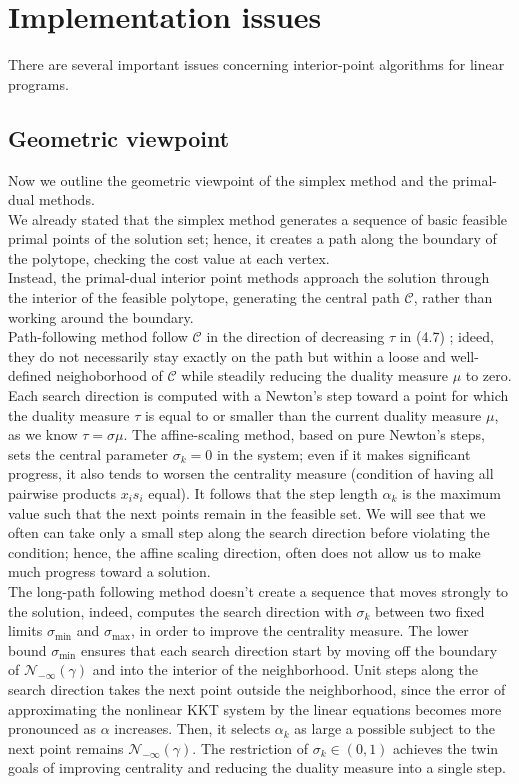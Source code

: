 \documentclass[a4paper,10 pt,titlepage,twoside]{book}
\theoremstyle{plain}
\theoremstyle{definition}
\theoremstyle{remark}
\begin{document}
\chapter{Implementation issues}
There are several important issues concerning interior-point algorithms
for linear programs.\\
\section*{Geometric viewpoint}
Now we outline the geometric viewpoint of the simplex method and the primal-dual methods.\\
We already stated that the simplex method generates a sequence of basic feasible primal points of the solution set; hence, it creates a path along the boundary of the polytope, checking the cost value at each vertex.\\Instead, the primal-dual interior point methods approach the solution through the interior of the feasible polytope, generating the central path $\mathcal{C}$, rather than working around the boundary.\\ Path-following method follow $\mathcal{C}$ in the direction of decreasing $\tau$ in (4.7) ; ideed, they do not necessarily stay exactly on the path but within a loose and well-defined neighoborhood of $\mathcal{C}$ while steadily reducing the duality measure $\mu$ to zero. Each search direction is computed with a Newton's step toward a point for which the duality measure $\tau$ is equal to or smaller than the current duality measure $\mu$, as we know $\tau=\sigma\mu$. 
The affine-scaling method, based on pure Newton's steps, sets the central parameter $\sigma_{k}= 0$ in the system;
even if it makes significant progress, it also tends to worsen the centrality measure (condition of having all pairwise products $x_{i}s_{i}$ equal). It follows that the step length $\alpha_{k}$ is the maximum value such that the next points remain in the feasible set. We will see that we often can take only a small
step along the search direction before violating the condition; hence, the affine scaling direction, often does not allow us to make much progress toward a solution.\\ 
The long-path following method doesn't create a sequence that moves strongly to the solution, indeed, computes the search direction with $\sigma_{k}$ between two fixed limits $\sigma_{\text{min}}$ and $\sigma_{\text{max}}$, in order to improve the centrality measure. The lower bound $\sigma_{\text{min}}$ ensures that each search direction start by moving off the boundary of $\mathcal{N}_{-\infty}(\gamma)$ and into the interior of the neighborhood. Unit steps along the search direction takes the next point outside the neighborhood, since the error of approximating the nonlinear KKT system by the linear equations becomes more pronounced as $\alpha$ increases. Then, it selects $\alpha_{k}$ as large a possible subject to the next point remains $\mathcal{N}_{-\infty}(\gamma)$. The restriction of $\sigma_{k}\in(0,1)$ achieves the twin goals of improving centrality and reducing the duality measure into a single step.\\
\end{document}
